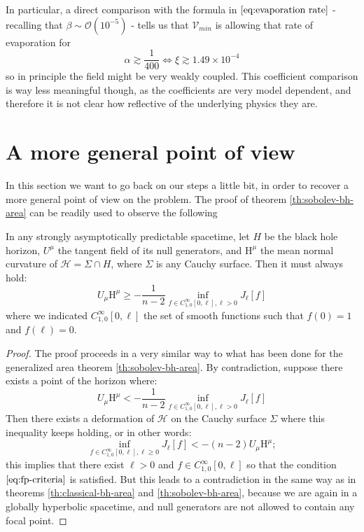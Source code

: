 In particular, a direct comparison with the formula in \(\eqref{eq:evaporation rate}\) - recalling that  \(\beta \sim \mathcal{O}(10^{-5})\) - tells us that \(\mathcal{V}_{min}\) is allowing that rate of evaporation for 
\[
\alpha \gtrsim \frac{1}{400} \iff \xi \gtrsim 1.49 \times 10^{-4}	
\]
so in principle the field might be very weakly coupled. This coefficient comparison is way less meaningful though, as the coefficients are very model dependent, and therefore it is not clear how reflective of the underlying physics they are.


\section{A more general point of view}

In this section we want to go back on our steps a little bit, in order to recover a more general point of view on the problem. 
The proof of theorem \ref{th:sobolev-bh-area} can be readily used to observe the following
\begin{lemma}
	In any strongly asymptotically predictable spacetime, let \(H\) be the black hole horizon, \(U^{\mu}\) the tangent field of its null generators, and \(\mathrm{H}^{\mu}\) the mean normal curvature of \(\mathscr{H} = \Sigma \cap H\), where \(\Sigma\) is any Cauchy surface. Then it must always hold:
	\[
	U_{\mu}\mathrm{H}^{\mu} \ge -\frac{1}{n - 2} \inf_{f\in C^{\infty}_{1,0}[0, \ell], \ell > 0}J_{\ell}[f]
	\]
	where we indicated \(C^{\infty}_{1,0}[0, \ell]\) the set of smooth functions such that \(f(0) = 1\) and \(f(\ell) = 0\).
\end{lemma}

\begin{proof}
	The proof proceeds in a very similar way to what has been done for the generalized area theorem \ref{th:sobolev-bh-area}. By contradiction, suppose there exists a point of the horizon where:
	\[
		U_{\mu}\mathrm{H}^{\mu} < -\frac{1}{n - 2} \inf_{f\in C^{\infty}_{1,0}[0, \ell], \ell > 0}J_{\ell}[f]	
	\]
	Then there exists a deformation of \(\mathscr{H}\) on the Cauchy surface \(\Sigma\) where this inequality keeps holding, or in other words:
	\[
	\inf_{f\in C^{\infty}_{1,0}[0, \ell], \ell \ge 0}J_{\ell}[f] < - (n - 2)U_{\mu}\mathrm{H}^{\mu};
	\]
	this implies that there exist \(\ell > 0\) and \(f\in C^{\infty}_{1,0}[0, \ell]\) so that the condition \(\eqref{eq:fp-criteria}\) is satisfied. But this leads to a contradiction in the same way as in theorems \ref{th:classical-bh-area} and \ref{th:sobolev-bh-area}, because we are again in a globally hyperbolic spacetime, and null generators are not allowed to contain any focal point.
\end{proof}

